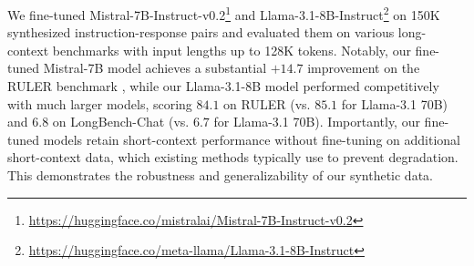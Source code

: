 We fine-tuned Mistral-7B-Instruct-v0.2\footnote{\url{https://huggingface.co/mistralai/Mistral-7B-Instruct-v0.2}} and Llama-3.1-8B-Instruct\footnote{\url{https://huggingface.co/meta-llama/Llama-3.1-8B-Instruct}} on 150K synthesized instruction-response pairs and evaluated them on various long-context benchmarks with input lengths up to 128K tokens.
Notably, our fine-tuned Mistral-7B model achieves a substantial $+14.7$ improvement on the RULER benchmark \citep{hsieh2024ruler}, while our Llama-3.1-8B model performed competitively with much larger models, scoring $84.1$ on RULER (vs. $85.1$ for Llama-3.1 70B) and $6.8$ on LongBench-Chat \citep{bai2024longalign} (vs. $6.7$ for Llama-3.1 70B). 
Importantly, our fine-tuned models retain short-context performance without fine-tuning on additional short-context data, which existing methods typically use to prevent degradation. This demonstrates the robustness and generalizability of our synthetic data.




